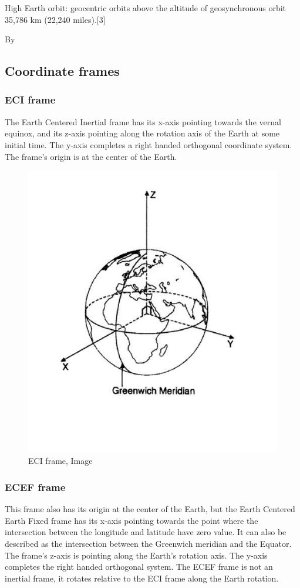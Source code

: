 \documentclass[12pt,a4paper,oneside]{article}
\begin{document}
High Earth orbit: geocentric orbits above the altitude of geosynchronous orbit 35,786 km (22,240 miles).[3]

By 

\subsection{Coordinate frames}
\subsubsection{ECI frame}
The Earth Centered Inertial frame has its x-axis pointing towards the vernal equinox, and its z-axis pointing along the rotation axis of the Earth at some initial time. The y-axis completes a right handed orthogonal coordinate system. The frame’s origin is at the center of the Earth.
\citet{larson1992space}
\begin{figure}[ht]
\includegraphics[scale=0.4]{eci_frame.jpg}
\centering
\caption{ECI frame, Image \citet{larson1992space}}
\label{fig:eci_frame}
\end{figure}
\subsubsection{ECEF frame}
This frame also has its origin at the center of the Earth, but the Earth Centered Earth Fixed frame has its x-axis pointing towards the point where the intersection between the longitude and latitude have zero value. It can also be described as the intersection between the Greenwich meridian and the Equator. The frame’s z-axis is pointing along the Earth’s rotation axis. The y-axis completes the right handed orthogonal system. The ECEF frame is not an inertial frame, it rotates relative to the ECI frame along the Earth rotation.
\end{document}
